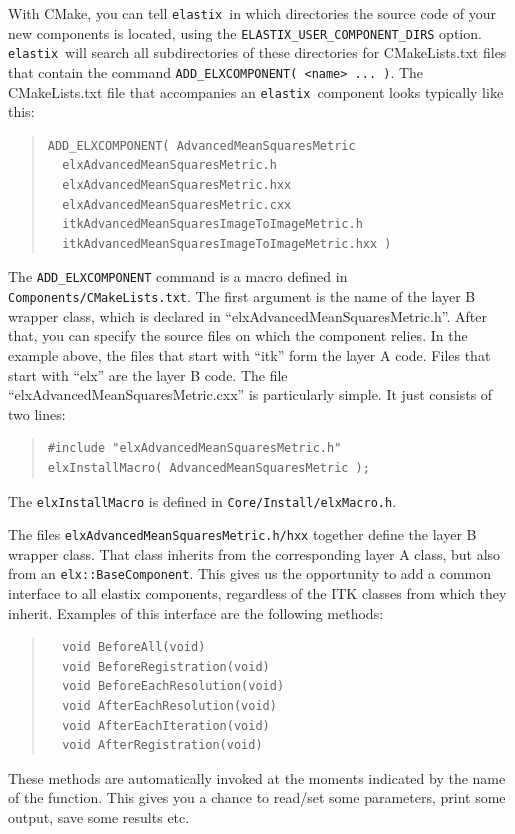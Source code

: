\documentclass[]{report}
\newcommand{\elastix}{\texttt{elastix}}
\begin{document}
With CMake, you can tell \elastix\ in which directories the source code of your
new components is located, using the \texttt{ELASTIX\_USER\_COMPONENT\_DIRS}
option. \elastix\ will search all subdirectories of these directories for
CMakeLists.txt files that contain the command \texttt{ADD\_ELXCOMPONENT( <name>
... )}. The CMakeLists.txt file that accompanies an \elastix\ component looks
typically like this:
\begin{quote}
\begin{verbatim}
ADD_ELXCOMPONENT( AdvancedMeanSquaresMetric
  elxAdvancedMeanSquaresMetric.h
  elxAdvancedMeanSquaresMetric.hxx
  elxAdvancedMeanSquaresMetric.cxx
  itkAdvancedMeanSquaresImageToImageMetric.h
  itkAdvancedMeanSquaresImageToImageMetric.hxx )
 \end{verbatim}
 \end{quote}
The \texttt{ADD\_ELXCOMPONENT} command is a macro defined in
\texttt{Components/CMakeLists.txt}. The first argument is the name
of the layer B wrapper class, which is declared in
``elxAdvancedMeanSquaresMetric.h''. After that, you can specify the
source files on which the component relies. In the example above,
the files that start with ``itk'' form the layer A code. Files that
start with ``elx'' are the layer B code. The file
``elxAdvancedMeanSquaresMetric.cxx'' is particularly simple. It just
consists of two lines:
\begin{quote}
\begin{verbatim}
#include "elxAdvancedMeanSquaresMetric.h"
elxInstallMacro( AdvancedMeanSquaresMetric );
\end{verbatim}
\end{quote}
The \texttt{elxInstallMacro} is defined in
\texttt{Core/Install/elxMacro.h}.

The files \texttt{elxAdvancedMeanSquaresMetric.h/hxx} together define the layer
B wrapper class. That class inherits from the corresponding layer A class, but
also from an \texttt{elx::BaseComponent}. This gives us the opportunity to add
a common interface to all elastix components, regardless of the ITK classes
from which they inherit. Examples of this interface are the following methods:
\begin{quote}
\begin{verbatim}
  void BeforeAll(void)
  void BeforeRegistration(void)
  void BeforeEachResolution(void)
  void AfterEachResolution(void)
  void AfterEachIteration(void)
  void AfterRegistration(void)
\end{verbatim}
\end{quote}
These methods are automatically invoked at the moments indicated by the name of
the function. This gives you a chance to read/set some parameters, print some
output, save some results etc.
\end{document}
